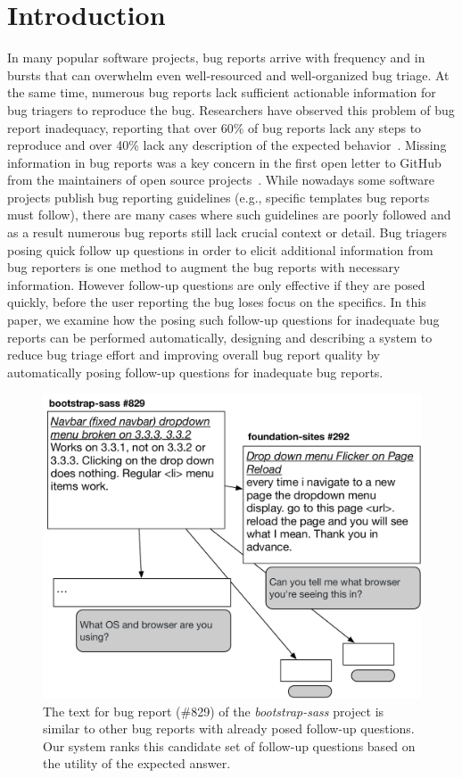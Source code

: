 \section{Introduction}

In many popular software projects, bug reports arrive with frequency and in bursts that can overwhelm even well-resourced and well-organized bug triage.
%
At the same time, numerous bug reports lack sufficient actionable information for bug triagers to reproduce the bug.
%
Researchers have observed this problem of bug report inadequacy, reporting that over 60\% of bug reports lack any steps to reproduce and over 40\% lack any description of the expected behavior~\cite{chaparro17detecting}.
%
Missing information in bug reports was a key concern in the first open letter to GitHub from the maintainers of open source projects~\cite{deargithub}.
%
While nowadays some software projects publish bug reporting guidelines (e.g., specific templates bug reports must follow), there are many cases where such guidelines are poorly followed and as a result numerous bug reports still lack crucial context or detail.
%
Bug triagers posing quick follow up questions in order to elicit additional information from bug reporters is one method to augment the bug reports with necessary information.
%
However follow-up questions are only effective if they are posed quickly, before the user reporting the bug loses focus on the specifics.
%
In this paper, we examine how the posing such follow-up questions for inadequate bug reports can be performed automatically, designing and describing a system to reduce bug triage effort and improving overall bug report quality by automatically posing follow-up questions for inadequate bug reports.

\begin{figure}[ht]
\centering
\includegraphics[width=0.99\linewidth]{figures/br_motivation.pdf}
\caption{The text for bug report (\#829) of the {\em bootstrap-sass} project is similar to other bug reports with already posed follow-up questions. Our system ranks this candidate set of follow-up questions based on the utility of the expected answer.}
\label{fig:repo_activity}
\end{figure}


